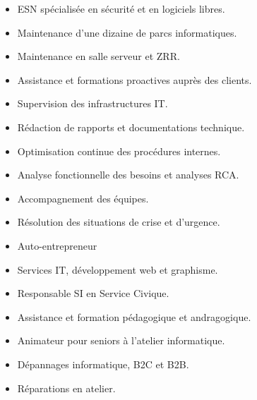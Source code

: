 \documentclass[10pt,a4paper,ragged2e,withhyper,normalphoto]{altacv}
\begin{document}
\begin{paracol}{2}

\begin{itemize}
\item ESN spécialisée en sécurité et en logiciels libres.
\item Maintenance d’une dizaine de parcs informatiques.
\item Maintenance en salle serveur et ZRR.
\item Assistance et formations proactives auprès des clients.
\item Supervision des infrastructures IT.
\item Rédaction de rapports et documentations technique.
\item Optimisation continue des procédures internes.
\item Analyse fonctionnelle des besoins et analyses RCA.
\item Accompagnement des équipes.
\item Résolution des situations de crise et d’urgence.

\end{itemize}

\divider

\begin{itemize}
\item Auto-entrepreneur
\item Services IT, développement web et graphisme.
\end{itemize}

\divider

\begin{itemize}
\item Responsable SI en Service Civique.
\item Assistance et formation pédagogique et andragogique.
\end{itemize}

\switchcolumn

\begin{itemize}
\item Animateur pour seniors à l'atelier informatique.
\end{itemize}

\divider

\begin{itemize}
\item Dépannages informatique, B2C et B2B.
\item Réparations en atelier.
\end{itemize}


\end{paracol}
\end{document}
